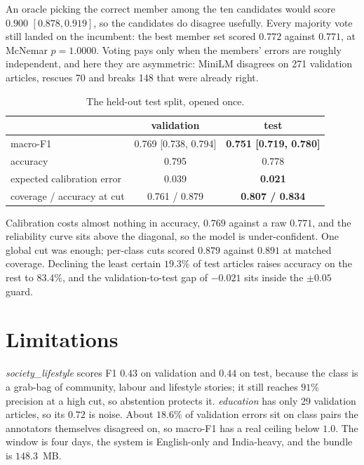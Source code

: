 \documentclass[conference]{IEEEtran}
\begin{document}
An oracle picking the correct member among the ten candidates would score $0.900$
$[0.878, 0.919]$, so the candidates do disagree usefully. Every majority vote still landed
on the incumbent: the best member set scored $0.772$ against $0.771$, at McNemar
$p = 1.0000$. Voting pays only when the members' errors are roughly independent, and here
they are asymmetric: MiniLM disagrees on 271 validation articles, rescues 70 and breaks
148 that were already right.

\begin{table}[!tb]
\caption{The held-out test split, opened once.}
\label{tab:test}
\centering
\footnotesize
\begin{tabular}{lcc}
\toprule
& validation & test \\
\midrule
macro-F1                     & 0.769 [0.738, 0.794] & \textbf{0.751 [0.719, 0.780]} \\
accuracy                     & 0.795 & 0.778 \\
expected calibration error   & 0.039 & \textbf{0.021} \\
coverage / accuracy at cut   & 0.761 / 0.879 & \textbf{0.807 / 0.834} \\
\bottomrule
\end{tabular}
\end{table}

Calibration costs almost nothing in accuracy, $0.769$ against a raw $0.771$, and the
reliability curve sits above the diagonal, so the model is under-confident. One global cut
was enough; per-class cuts scored $0.879$ against $0.891$ at matched coverage. Declining
the least certain $19.3\%$ of test articles raises accuracy on the rest to $83.4\%$, and
the validation-to-test gap of $-0.021$ sits inside the $\pm 0.05$ guard.

\section{Limitations}

\textit{society\_lifestyle} scores F1 $0.43$ on validation and $0.44$ on test, because the
class is a grab-bag of community, labour and lifestyle stories; it still reaches $91\%$
precision at a high cut, so abstention protects it. \textit{education} has only 29
validation articles, so its $0.72$ is noise. About $18.6\%$ of validation errors sit on
class pairs the annotators themselves disagreed on, so macro-F1 has a real ceiling below
$1.0$. The window is four days, the system is English-only and India-heavy, and the bundle
is $148.3$~MB.
\end{document}
